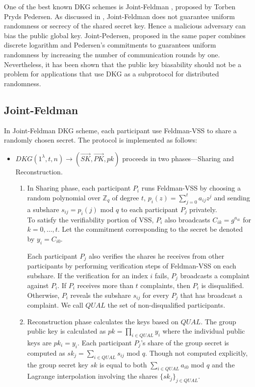 \documentclass[letterpaper,twocolumn,10pt]{article}
\theoremstyle{definition}
\theoremstyle{remark}
\begin{document}
One of the best known DKG schemes is Joint-Feldman \cite{pedersen1991threshold}, proposed by Torben Pryds Pedersen. As discussed in \cite{gennaro1999secure}, Joint-Feldman does not guarantee uniform randomness or secrecy of the shared secret key. Hence a malicious adversary can bias the public global key. Joint-Pedersen, proposed in the same paper combines discrete logarithm and Pedersen's commitments to guarantees uniform randomness by increasing the number of communication rounds by one.  Nevertheless, it has been shown that the public key biasability should not be a problem for applications that use DKG as a subprotocol for distributed randomness.
\subsection{Joint-Feldman}
\label{appendix:jointFeldman}
In Joint-Feldman DKG scheme, each participant use Feldman-VSS to share a randomly chosen secret. The protocol is implemented as follows:
\begin{itemize}
    \item $DKG(1^{\lambda}, t, n) \rightarrow (\vec{SK}, \vec{PK}, pk)$  proceeds in two phases---Sharing and Reconstruction.
    \begin{enumerate}
        \item In Sharing phase, each participant $P_i$ runs Feldman-VSS by choosing a random polynomial over $\mathbb{Z}_q$ of degree $t$, $p_i(z) = \sum_{j = 0}^{t} a_{ij} z^j$ and sending a subshare $s_{ij} = p_i(j)$ mod $q$ to each participant $P_j$ privately. \\
        To satisfy the verifiability portion of VSS, $P_i$ also broadcasts $C_{ik} = g^{a_{ik}}$ for $k = 0, \ldots, t$. Let the commitment corresponding to the secret be denoted by $y_i = C_{i0}$.
        
        Each participant $P_j$ also verifies the shares he receives from other participants by performing verification steps of Feldman-VSS on each subshare. If the verification for an index $i$ fails, $P_j$ broadcasts a complaint against $P_i$. If $P_i$ receives more than $t$ complaints, then $P_i$ is disqualified. Otherwise, $P_i$ reveals the subshare $s_{ij}$ for every $P_j$ that has broadcast a complaint. We call $QUAL$ the set of non-disqualified participants.
        
        \item Reconstruction phase calculates the keys based on $QUAL$.
        The group public key is calculated as $pk = \prod_{i \in QUAL} y_i$ where the individual public keys are $pk_i = y_i$. Each participant $P_j$'s share of the group secret is  computed as $sk_j = \sum_{i \in QUAL} s_{ij}$ mod $q$.  Though not computed explicitly, the group secret key $sk$ is equal to both $\sum_{i \in QUAL} a_{i0}$ mod $q$ and the Lagrange interpolation involving the shares $\{sk_j\}_{j \in QUAL}$.
    \end{enumerate}
\end{itemize}
\end{document}
